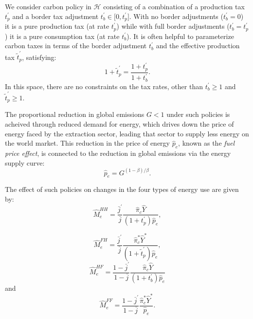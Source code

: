 \documentclass[notitlepage,12pt]{article}
\begin{document}
We consider carbon policy in $\mathcal{H}$ consisting of a combination of a
production tax $t_{p}^{\prime }$ and a border tax adjustment $t_{b}^{\prime
}\in \lbrack 0,t_{p}^{\prime }]$. With no border adjustments ($t_{b}^{\prime
}=0$) it is a pure production tax (at rate $t_{p}^{\prime }$) while with
full border adjustments ($t_{b}^{\prime }=t_{p}^{\prime }$) it is a pure
consumption tax (at rate $t_{b}^{\prime }$). It is often helpful to
parameterize carbon taxes in terms of the border adjustment $t_{b}^{\prime }$
and the effective production tax $\tilde{t}_{p}^{\prime }$, satisfying:%
\begin{equation*}
1+\tilde{t}_{p}^{\prime }=\frac{1+t_{p}^{\prime }}{1+t_{b}^{\prime }}.
\end{equation*}%
In this space, there are no constraints on the tax rates, other than $%
t_{b}^{\prime }\geq 1$ and $\tilde{t}_{p}^{\prime }\geq 1$.

The proportional reduction in global emissions $G<1$ under such policies is
acheived through reduced demand for energy, which drives down the price of
energy faced by the extraction sector, leading that sector to supply less
energy on the world market. This reduction in the price of energy $\hat{p}%
_{e}$, known as the \emph{fuel price effect}, is connected to the reduction
in global emissions via the energy supply curve:%
\begin{equation}
\hat{p}_{e}=G^{(1-\beta )/\beta }.  \label{fuel price effect}
\end{equation}

The effect of such policies on changes in the four types of energy use are
given by:%
\begin{equation*}
\hat{M}_{e}^{HH}=\frac{\bar{j}^{\prime }}{\bar{j}}\frac{\hat{\pi}_{c}\hat{Y}%
}{\left( 1+t_{p}^{\prime }\right) \hat{p}_{e}},
\end{equation*}

\begin{equation*}
\hat{M}_{e}^{FH}=\frac{\bar{j}^{\prime }}{\bar{j}}\frac{\hat{\pi}_{c}^{\ast }%
\hat{Y}^{\ast }}{\left( 1+\tilde{t}_{p}^{\prime }\right) \hat{p}_{e}},
\end{equation*}%
\begin{equation*}
\hat{M}_{e}^{HF}=\frac{1-\bar{j}^{\prime }}{1-\bar{j}}\frac{\hat{\pi}_{c}%
\hat{Y}}{\left( 1+t_{b}^{\prime }\right) \hat{p}_{e}}
\end{equation*}%
and%
\begin{equation*}
\hat{M}_{e}^{FF}=\frac{1-\bar{j}^{\prime }}{1-\bar{j}}\frac{\hat{\pi}%
_{c}^{\ast }\hat{Y}^{\ast }}{\hat{p}_{e}}.
\end{equation*}
\end{document}
